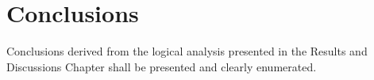 \chapter{Conclusions}
Conclusions derived from the logical analysis presented in the Results and Discussions Chapter shall be presented and clearly enumerated.
	